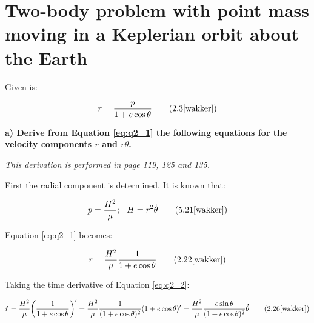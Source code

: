 \section{Two-body problem with point mass moving in a Keplerian orbit about the Earth}\label{sec:q2}

Given is:

\begin{equation}
    r = \frac{p}{1 + e\cos{\theta}}
    \tag{2.3\cite{wakker}}
    \label{eq:q2_1}
\end{equation}








\noindent \textbf{a) Derive from Equation \ref{eq:q2_1} the following equations for the velocity components $\dot{r}$ and $r\dot{\theta}$.}

\bigskip

\noindent \textit{This derivation is performed in \cite{wakker} page 119, 125 and 135.}

\bigskip

\noindent First the radial component is determined. It is known that:

\begin{equation}
    p = \frac{H^2}{\mu}; \hspace{0.25cm} H = r^2 \dot{\theta}
    \tag{5.21\cite{wakker}}
    \label{eq:q2_p}
\end{equation}

\noindent Equation \ref{eq:q2_1} becomes:

\begin{equation}
    r = \frac{H^2}{\mu}\frac{1}{1 + e\cos{\theta}}
    \tag{2.22\cite{wakker}}
    \label{eq:q2_2}
\end{equation}

\noindent Taking the time derivative of Equation \ref{eq:q2_2}:

\begin{equation}
    \dot{r} = \frac{H^2}{\mu}\bigg( \frac{1}{1 + e\cos{\theta}} \bigg)' = \frac{H^2}{\mu} \frac{1}{(1 + e\cos{\theta})^2} (1 + e\cos{\theta})' = \frac{H^2}{\mu} \frac{e\sin{\theta}}{(1 + e\cos{\theta})^2} \dot{\theta} 
    \tag{2.26\cite{wakker}}
    \label{eq:q2_3}
\end{equation}

